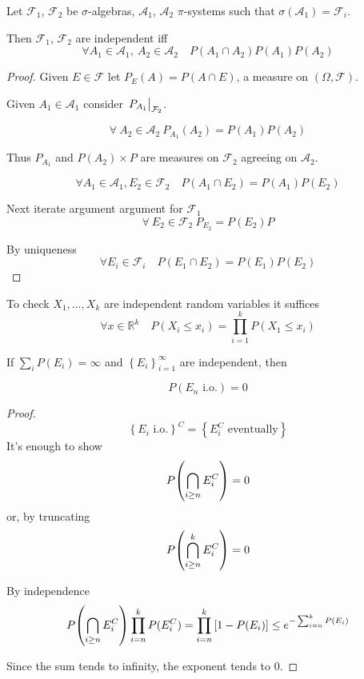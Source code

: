 \begin{lemma} \label{ind_lemma}
	Let $\mathcal{F}_1$, $\mathcal{F}_2$ be $\sigma$-algebras, $\mathcal{A}_1$, $\mathcal{A}_2$ $\pi$-systems such that $\sigma(\mathcal{A_1})=\mathcal{F}_i$.
	
	Then $\mathcal{F}_1$, $\mathcal{F}_2$ are independent iff 
	$$\forall A_1\in \mathcal{A}_1, \: A_2\in \mathcal{A}_2 \quad P(A_1\cap A_2) P(A_1)P(A_2)$$ 
	\begin{proof}
		Given $E \in \mathcal{F}$ let $P_E(A) = P(A\cap E)$, a measure on $(\Omega, \mathcal{F})$.
		
		Given $A_1\in \mathcal{A}_1$ consider $\eval{P_{A_1}}_{\mathcal{F}_2}$.
			
		$$\forall \: A_2\in \mathcal{A}_2 \: P_{A_1}(A_2) = P(A_1)P(A_2)$$
		
		Thus $P_{A_1}$ and $P(A_2)\times P$ are measures on $\mathcal{F}_2$ agreeing on $\mathcal{A}_2$.
		
		$$\forall A_1 \in \mathcal{A}_1 , E_2\in \mathcal{F}_2  \quad P(A_1\cap E_2) = P(A_1)P(E_2)$$
		
		Next iterate argument argument for  $\mathcal{F}_1 $
		$$\forall \: E_2\in \mathcal{F}_2 \: P_{E_2}= P(E_2)P$$
		
		By uniqueness 
		$$\forall E_i \in \mathcal{F}_i \quad P(E_1\cap E_2) = P(E_1)P(E_2)$$  
	\end{proof}

\begin{coll}
	To check $X_1,\dots, X_k$ are independent random variables it suffices 
	$$\forall x\in \mathbb{R}^k  \quad P(X_i\leq x_i) = \prod_{i=1}^k P(X_1\leq x_i)$$ 
\end{coll}
\end{lemma}

\begin{lemma}
	 \label{bc2}
	 If $\sum_i P(E_i) =\infty$ and $\left\{ E_i \right\}_{i=1}^\infty $ are independent, then 
	 
	 $$P(E_n \text{ i.o.}) =0$$
	 \begin{proof}
	 	$$\left\{ E_i  \text{ i.o.} \right\}^C =\left\{ E_i^C  \text{ eventually} \right\} $$
	 	It's enough to show
	 	$$P\qty(\bigcap_{i\geq n} E_i^C) = 0 $$
	 	or, by truncating
	 	$$P\qty(\bigcap_{i\geq n}^k E_i^C) = 0 $$
	 	
	 	By independence
	 	$$P\qty(\bigcap_{i\geq n} E_i^C) \prod_{i=n}^k P(E_i^C) = \prod_{i=n}^k \qty[1-P(E_i)] \leq e^{-\sum_{i=n}^k P(E_i)}$$
	 	
	 	Since the sum tends to infinity, the exponent tends to $0$.
	 \end{proof}
\end{lemma}

